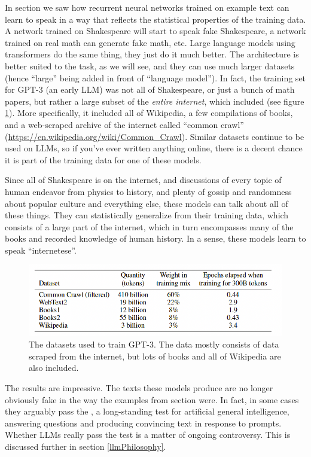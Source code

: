 In section  we saw how recurrent neural networks trained on example text can learn to speak in a way that reflects the statistical properties of the training data. A network trained on Shakespeare will start to speak fake Shakespeare, a network trained on real math can generate fake math, etc.  Large language models using transformers do the same thing, they just do it much better. The architecture is better suited to the task, as we will see, and they can use much larger datasets (hence ``large'' being added in front of ``language model''). In fact, the training set for GPT-3 (an early LLM) was not all of Shakespeare, or just a bunch of math papers, but rather a large subset of the \emph{entire internet}, which included  (see figure \ref{gptDatasets}). More specifically, it included all of Wikipedia, a few compilations of books, and a web-scraped archive of the internet called ``common crawl'' (\url{https://en.wikipedia.org/wiki/Common_Crawl}). Similar datasets continue to be used on LLMs, so if you've ever written anything online, there is a decent chance it is part of the training data for one of these models. 

Since all of Shakespeare is on the internet, and discussions of every topic of human endeavor from physics to history, and plenty of gossip and randomness about popular culture and everything else, these models can talk about all of these things. They can statistically generalize from their training data, which consists of a large part of the internet, which in turn encompasses many of the books and recorded knowledge of human history. In a sense, these models learn to speak ``internetese''.  

\begin{figure}[h]
\centering
\includegraphics[scale=.4]{./images/gptDatasets}
\caption[From \cite{brown2020language}.]{The datasets used to train GPT-3. The data mostly consists of data scraped from the internet, but lots of books and all of Wikipedia are also included.}
\label{gptDatasets}
\end{figure}

The results are impressive. The texts these models produce are no longer obviously fake in the way the examples from section  were. In fact, in some cases they arguably pass the , a long-standing test for artificial general intelligence, answering questions and producing convincing  text in response to prompts. Whether LLMs really pass the test is a matter of ongoing controversy.  This is discussed further in section \ref{llmPhilosophy}.

